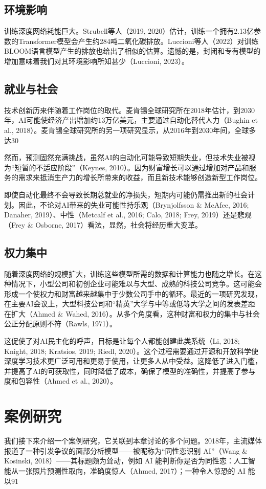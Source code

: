 \subsection{环境影响}
训练深度网络耗能巨大。Strubell等人（2019, 2020）估计，训练一个拥有2.13亿参数的Transformer模型会产生约284吨二氧化碳排放。Luccioni等人（2022）对训练BLOOM语言模型产生的排放也给出了相似的估算。遗憾的是，封闭和专有模型的增加意味着我们对其环境影响所知甚少（Luccioni, 2023）。

\subsection{就业与社会}
技术创新历来伴随着工作岗位的取代。麦肯锡全球研究所在2018年估计，到2030年，AI可能使经济产出增加约13万亿美元，主要通过自动化替代人力（Bughin et al., 2018）。麦肯锡全球研究所的另一项研究显示，从2016年到2030年间，全球多达30%

然而，预测固然充满挑战，虽然AI的自动化可能导致短期失业，但技术失业被视为“短暂的不适应阶段”（Keynes, 2010）。因为财富增长可以通过增加对产品和服务的需求来抵消生产力的增长所带来的收益，而且新技术能够创造新型工作岗位。

即使自动化最终不会导致长期总就业的净损失，短期内可能仍需推出新的社会计划。因此，不论对AI带来的失业可能性持乐观（Brynjolfsson \& McAfee, 2016; Danaher, 2019）、中性（Metcalf et al., 2016; Calo, 2018; Frey, 2019）还是悲观（Frey \& Osborne, 2017）看法，显然，社会将经历重大变革。

\subsection{权力集中}
随着深度网络的规模扩大，训练这些模型所需的数据和计算能力也随之增长。在这种情况下，小型公司和初创企业可能难以与大型、成熟的科技公司竞争。这可能会形成一个使权力和财富越来越集中于少数公司手中的循环。最近的一项研究发现，在主要AI会议上，大型科技公司和“精英”大学与中等或低等大学之间的发表差距在扩大（Ahmed \& Wahed, 2016）。从多个角度看，这种财富和权力的集中与社会公正分配原则不符（Rawls, 1971）。

这促使了对AI民主化的呼声，目标是让每个人都能创建此类系统（Li, 2018; Knight, 2018; Kratsios, 2019; Riedl, 2020）。这个过程需要通过开源和开放科学使深度学习技术更广泛可用和更易于使用，让更多人从中受益。这降低了进入门槛，并提高了AI的可获取性，同时降低了成本，确保了模型的准确性，并提高了参与度和包容性（Ahmed et al., 2020）。

\section{案例研究}
我们接下来介绍一个案例研究，它关联到本章讨论的多个问题。2018年，主流媒体报道了一种引发争议的面部分析模型——被昵称为“同性恋识别 AI”（Wang \& Kosinski, 2018）——其标题颇为耸动，例如 AI 能判断你是否为同性恋：人工智能从一张照片预测性取向，准确度惊人（Ahmed, 2017）；一种令人惊恐的 AI 能以91%

